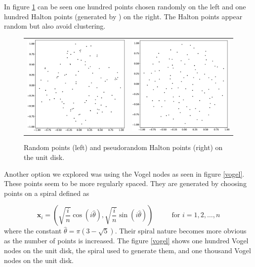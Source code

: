 \documentclass[12pt]{article}
\let\vec\mathbf
\begin{document}
In figure \ref{randomhalton} can be seen one hundred points chosen randomly on the left and one hundred Halton points (generated by \cite{Burkardt2016}) on the right. The Halton points appear random but also avoid clustering.

\begin{figure}[h]
	\centering
	\begin{tabular}{cc}
		\includegraphics[width=.5\textwidth]{random_100_disk.eps} & \includegraphics[width=.5\textwidth]{halton_100_disk.eps} \\
	\end{tabular}
	\caption{Random points (left) and pseudorandom Halton points (right) on the unit disk.}
	\label{randomhalton}
\end{figure}

Another option we explored was using the Vogel nodes as seen in figure \ref{vogel}. These points seem to be more regularly spaced. They are generated by choosing points on a spiral defined as

$$
\vec{x}_i = \left( \sqrt{\frac{i}{n}}\cos(i\hat{\theta}), \sqrt{\frac{i}{n}}\sin(i\hat{\theta})  \right) \phantom{==}\text{for } i = 1, 2, \dots, n
$$
where the constant $\hat{\theta} = \pi (3-\sqrt{5})$. Their spiral nature becomes more obvious as the number of points is increased. The figure \ref{vogel} shows one hundred Vogel nodes on the unit disk, the spiral used to generate them, and one thousand Vogel nodes on the unit disk.
\end{document}
